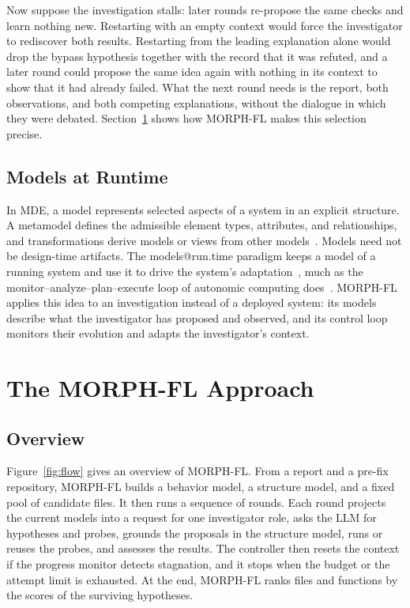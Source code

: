 \documentclass[letterpaper,journal]{IEEEtran}
\newcommand{\tool}{MORPH-FL}
\begin{document}
Now suppose the investigation stalls: later rounds re-propose the same checks and learn nothing new. Restarting with an empty context would force the investigator to rediscover both results. Restarting from the leading explanation alone would drop the bypass hypothesis together with the record that it was refuted, and a later round could propose the same idea again with nothing in its context to show that it had already failed. What the next round needs is the report, both observations, and both competing explanations, without the dialogue in which they were debated. Section~\ref{sec:approach} shows how \tool{} makes this selection precise.

\subsection{Models at Runtime}\label{sec:mde_background}
In MDE, a model represents selected aspects of a system in an explicit structure. A metamodel defines the admissible element types, attributes, and relationships, and transformations derive models or views from other models~\cite{mde2006}. Models need not be design-time artifacts. The models@run.time paradigm keeps a model of a running system and use it to drive the system's adaptation~\cite{modelsruntime2009}, much as the monitor--analyze--plan--execute loop of autonomic computing does~\cite{mapek2003}. \tool{} applies this idea to an investigation instead of a deployed system: its models describe what the investigator has proposed and observed, and its control loop monitors their evolution and adapts the investigator's context.

\section{The MORPH-FL Approach}\label{sec:approach}
\subsection{Overview}\label{sec:overview}
Figure~\ref{fig:flow} gives an overview of \tool{}. From a report and a pre-fix repository, \tool{} builds a behavior model, a structure model, and a fixed pool of candidate files. It then runs a sequence of rounds. Each round projects the current models into a request for one investigator role, asks the LLM for hypotheses and probes, grounds the proposals in the structure model, runs or reuses the probes, and assesses the results. The controller then resets the context if the progress monitor detects stagnation, and it stops when the budget or the attempt limit is exhausted. At the end, \tool{} ranks files and functions by the scores of the surviving hypotheses.
\end{document}
